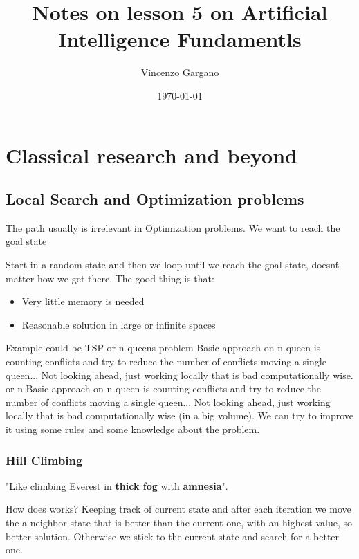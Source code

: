 \documentclass[12pt]{book}
\title{Notes on lesson 5 on Artificial Intelligence Fundamentls}
\author{Vincenzo Gargano}
\begin{document}

\date{\today}

\maketitle

\tableofcontents
\clearpage

\chapter{Classical research and beyond}

\section{Local Search and Optimization problems}

The path usually is irrelevant in Optimization problems. We want to reach the goal state

Start in a random state and then we loop until we reach the goal state, doesn\'t matter how we get there.
The good thing is that:

\begin{itemize}
	\item Very little memory is needed
	\item Reasonable solution in large or infinite spaces
\end{itemize}

Example could be TSP or n-queens problem
Basic approach on n-queen is counting conflicts and try to reduce the number of conflicts moving a single queen...
Not looking ahead, just working locally that is bad computationally wise.
or n-Basic approach on n-queen is counting conflicts and try to reduce the number of conflicts moving a single queen...
Not looking ahead, just working locally that is bad computationally wise (in a big volume).
We can try to improve it using some rules and some knowledge about the problem.

\subsection{Hill Climbing}

"Like climbing Everest in \textbf{thick fog} with \textbf{amnesia}".

How does works? 
Keeping track of current state and after each iteration we move the a neighbor state that is better than the current one, with an highest value, so better solution.
Otherwise we stick to the current state and search for a better one.
\clearpage
\end{document}
